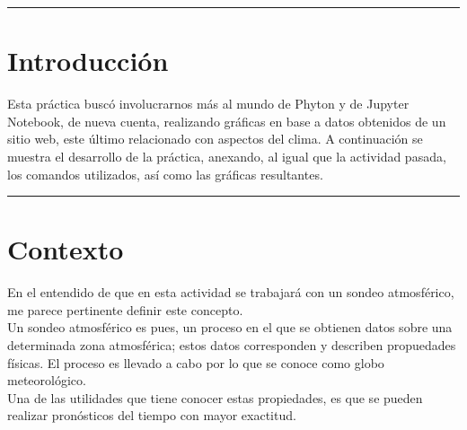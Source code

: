 \documentclass{article}
\begin{document}
\pagebreak
\begin{doublespace}

\hrule
\section{Introducción}
Esta práctica buscó involucrarnos más al mundo de Phyton y de Jupyter Notebook, de nueva cuenta, realizando gráficas en base a datos obtenidos de un sitio web, este último relacionado con aspectos del clima. A continuación se muestra el desarrollo de la práctica, anexando, al igual que la actividad pasada, los comandos utilizados, así como las gráficas resultantes.
\\
\hrule

\section{Contexto}
En el entendido de que en esta actividad se trabajará con un sondeo atmosférico, me parece pertinente definir este concepto.
\\
Un sondeo atmosférico es pues, un proceso en el que se obtienen datos sobre una determinada zona atmosférica; estos datos corresponden y describen propuedades físicas. El proceso es llevado a cabo por lo que se conoce como globo meteorológico. \\

Una de las utilidades que tiene conocer estas propiedades, es que se pueden realizar pronósticos del tiempo con mayor exactitud. 


\end{doublespace}
\end{document}
